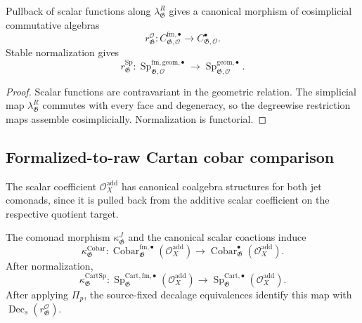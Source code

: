 \begin{proposition}
\label{prop:as-formalized-raw-scalar}
Pullback of scalar functions along
$\lambda^R_{\mathfrak G}$ gives a canonical morphism of cosimplicial
commutative algebras
\[
\boxed{
    r_{\mathfrak G}^{\mathcal O}:
    C_{\mathfrak G,\mathcal O}^{\mathrm{fm},\bullet}
    \longrightarrow
    C_{\mathfrak G,\mathcal O}^{\bullet}.
}
\]
Stable normalization gives
\[
\boxed{
    r_{\mathfrak G}^{\mathrm{Sp}}:
    \operatorname{Sp}_{\mathfrak G,\mathcal O}^{\mathrm{fm,geom},\bullet}
    \longrightarrow
    \operatorname{Sp}_{\mathfrak G,\mathcal O}^{\mathrm{geom},\bullet}.
}
\]
\end{proposition}

\begin{proof}
Scalar functions are contravariant in the geometric relation.  The
simplicial map $\lambda^R_{\mathfrak G}$ commutes with every face and
degeneracy, so the degreewise restriction maps assemble cosimplicially.
Normalization is functorial.
\end{proof}

\subsection{Formalized-to-raw Cartan cobar comparison}

The scalar coefficient $\mathcal O_X^{\mathrm{add}}$ has canonical coalgebra
structures for both jet comonads, since it is pulled back from the additive
scalar coefficient on the respective quotient target.

\begin{proposition}
\label{prop:as-raw-formalized-cobar}
The comonad morphism $\kappa^J_{\mathfrak G}$ and the canonical scalar
coactions induce
\[
\boxed{
    \kappa^{\mathrm{Cobar}}_{\mathfrak G}:
    \operatorname{Cobar}_{\mathfrak G}^{\mathrm{fm},\bullet}
    (\mathcal O_X^{\mathrm{add}})
    \longrightarrow
    \operatorname{Cobar}_{\mathfrak G}^{\bullet}
    (\mathcal O_X^{\mathrm{add}}).
}
\]
After normalization,
\[
\boxed{
    \kappa^{\mathrm{CartSp}}_{\mathfrak G}:
    \operatorname{Sp}^{\mathrm{Cart,fm},\bullet}_{\mathfrak G}
    (\mathcal O_X^{\mathrm{add}})
    \longrightarrow
    \operatorname{Sp}^{\mathrm{Cart},\bullet}_{\mathfrak G}
    (\mathcal O_X^{\mathrm{add}}).
}
\]
After applying $\Pi_p$, the source-fixed decalage equivalences identify this
map with
$\operatorname{Dec}_s(r_{\mathfrak G}^{\mathcal O})$.
\end{proposition}

